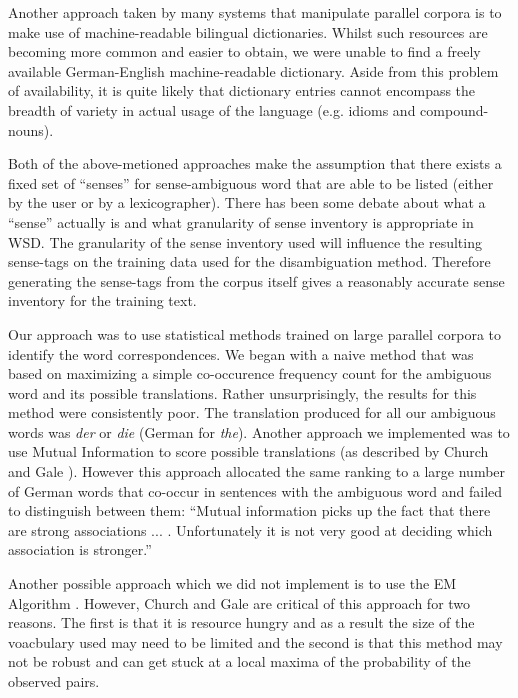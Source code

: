 \documentclass[a4wide,10pt]{article}
\begin{document}
Another approach taken by many systems that manipulate parallel corpora 
is to make use of machine-readable bilingual dictionaries. 
Whilst such resources are becoming more common and easier to obtain, we
were unable to find a freely available German-English machine-readable 
dictionary. Aside from this problem of availability, it is quite likely that 
dictionary entries cannot encompass the breadth of variety in actual usage 
of the language (e.g. idioms and compound-nouns).

Both of the above-metioned approaches make the assumption that there exists 
a fixed set of ``senses'' for sense-ambiguous word that are 
able to be listed (either by the user or by a lexicographer). There has been 
some debate about what a ``sense'' actually is \cite{manning99}
and what granularity of sense inventory is appropriate in 
WSD. The granularity of the sense inventory used will influence the resulting 
sense-tags on the training data used for the disambiguation method. Therefore
generating the sense-tags from the corpus itself gives a reasonably
accurate sense inventory for the training text.  

Our approach was to use statistical methods trained on large
parallel corpora to identify the word correspondences. 
We began with a naive method that was based on maximizing a simple 
co-occurence frequency count for the ambiguous word and its possible 
translations. Rather unsurprisingly, the results for this method were 
consistently poor. The translation produced for all our ambiguous words
was {\it der} or {\it die} (German for {\it the}).   
Another approach we implemented was to use Mutual Information to score 
possible translations (as described by Church and Gale \cite{gale91word}). 
However 
this approach allocated the same ranking to a large number of German words 
that co-occur in sentences with the ambiguous word and failed to 
distinguish between them: ``Mutual information picks up the fact that there 
are strong associations ... . Unfortunately it is not very good at 
deciding which association is stronger.''\cite{gale91word}

Another possible approach which we did not implement is to use the EM 
Algorithm \cite{brown}. However, Church and Gale are critical of 
this approach for two reasons. The first is that it is resource hungry and
as a result the size of the voacbulary used may need to be limited and the 
second is that this method may not be robust and can get stuck at a local 
maxima of the probability of the observed pairs.
\end{document}

